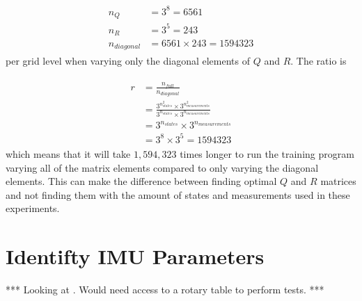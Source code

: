 \begin{align*}
\begin{split}
n_Q &= 3^8 = 6561 \\
n_R &= 3^5 = 243 \\
n_{diagonal} &= 6561 \times 243 = 1594323
\end{split}
\end{align*}
per grid level when varying only the diagonal elements of $Q$ and $R$. The ratio is

\begin{align}
\label{eq:trainingRatio}
\begin{split}
r &= \frac{n_{full}}{n_{diagonal}} \\
&= \frac{3^{n_{states}^2} \times 3^{n_{measurements}^2}}{3^{n_{states}} \times 3^{n_{measurements}}} \\
&= 3^{n_{states}} \times 3^{n_{measurements}} \\
&= 3^8 \times 3^5 = 1594323
\end{split}
\end{align}
which means that it will take $1,594,323$ times longer to run the training program varying all of the matrix elements compared to only varying the diagonal elements. This can make the difference between finding optimal $Q$ and $R$ matrices and not finding them with the amount of states and measurements used in these experiments.

\section{Identifty IMU Parameters}
\label{sec:identifyimuparams}
*** Looking at \cite{ChungOjeda01}. Would need access to a rotary table to perform tests. ***